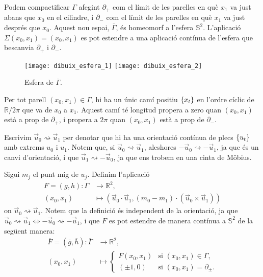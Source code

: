 Podem compactificar $\Gamma$ afegint $\partial_+$ com el límit de les parelles en què $x_1$ va just abans que $x_0$ en el cilindre, i $\partial_-$ com el límit de les parelles en què $x_1$ va just després que $x_0$. Aquest nou espai, $\overline{\Gamma}$, és homeomorf a l'esfera $\mathbb S^2$. L'aplicació $\Sigma(x_0,x_1) = (x_0,x_1)$ es pot estendre a una aplicació contínua de l'esfera que bescanvia $\partial_+$ i $\partial_-$.

\begin{figure}[htbp]
    \centering
    \texttt{[image: dibuix\_esfera\_1]}
    \raisebox{5\height}{$\quad\quad\Large\cong\quad$}
    \texttt{[image: dibuix\_esfera\_2]}
    \caption{Esfera de $\overline{\Gamma}$.}
    \label{fig:esfera}
\end{figure}

Per tot parell $(x_0,x_1)\in{\Gamma}$, hi ha un únic camí positiu $\{x_t\}$ en l'ordre cíclic de $\mathbb R/2\pi$ que va de $x_0$ a $x_1$. Aquest camí té longitud propera a zero quan $(x_0,x_1)$ està a prop de $\partial_+$, i propera a $2\pi$ quan $(x_0,x_1)$ està a prop de $\partial_-$.

Escrivim $\vec u_0\rightsquigarrow\vec u_1$ per denotar que hi ha una orientació contínua de plecs $\{u_t\}$ amb extrems $u_0$ i $u_1$. Notem que, si $\vec u_0\rightsquigarrow\vec u_1$, aleshores $-\vec u_0\rightsquigarrow-\vec u_1$, ja que és un canvi d'orientació, i que $\vec u_1\rightsquigarrow-\vec u_0$, ja que ens trobem en una cinta de Möbius. 

Sigui $m_j$ el punt mig de $u_j$. Definim l'aplicació
\begin{align*}
    F=(g,h): {\Gamma}&\to\mathbb R^2,\\
    (x_0,x_1)&\mapsto(\vec u_0\cdot\vec u_1, (m_0- m_1)\cdot(\vec u_0\times\vec u_1))
\end{align*}
on $\vec u_0\rightsquigarrow\vec u_1$. Notem que la definició és independent de la orientació, ja que $\vec u_0\rightsquigarrow\vec u_1\iff-\vec u_0\rightsquigarrow-\vec u_1$, i que $F$ es pot estendre de manera contínua a $\mathbb S^2$ de la següent manera:
\begin{align*}
    \overline{F}=(\overline{g},\overline{h}): \overline{\Gamma}&\to\mathbb R^2,\\
    (x_0,x_1)&\mapsto\begin{cases}
        F(x_0,x_1) & \text{si } (x_0,x_1)\in{\Gamma},\\
        (\pm 1,0) & \text{si } (x_0,x_1)={\partial_\pm}.
    \end{cases}
\end{align*}

